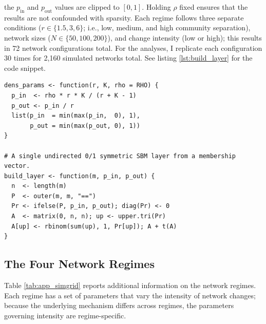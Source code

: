 \documentclass[11pt, letterpaper]{article}
\numberwithin{equation}{section}
\begin{document}
\noindent the $p_{\text{in}}$ and $p_{\text{out}}$ values are clipped to $[0,1]$. Holding $\rho$ fixed ensures that the results are not confounded with sparsity. Each regime follows three separate conditions ($r \in \{1.5, 3, 6\}$; i.e., low, medium, and high community separation), network sizes ($N \in \{50, 100, 200\}$), and change intensity (low or high); this results in 72 network configurations total. For the analyses, I replicate each configuration 30 times for 2,160 simulated networks total. See listing \ref{lst:build_layer} for the code snippet. 


\begin{lstlisting}[caption={Density parameterization and layer construction.},
                   label={lst:build_layer}]
dens_params <- function(r, K, rho = RHO) {
  p_in  <- rho * r * K / (r + K - 1)
  p_out <- p_in / r
  list(p_in  = min(max(p_in,  0), 1),
       p_out = min(max(p_out, 0), 1))
}

# A single undirected 0/1 symmetric SBM layer from a membership vector.
build_layer <- function(m, p_in, p_out) {
  n  <- length(m)
  P  <- outer(m, m, "==")
  Pr <- ifelse(P, p_in, p_out); diag(Pr) <- 0
  A  <- matrix(0, n, n); up <- upper.tri(Pr)
  A[up] <- rbinom(sum(up), 1, Pr[up]); A + t(A)
}
\end{lstlisting}

\subsection{The Four Network Regimes}
Table \ref{tab:app_simgrid} reports additional information on the network regimes. Each regime has a set of parameters that vary the intensity of network changes; because the underlying mechanism differs across regimes, the parameters governing intensity are regime-specific.
\end{document}
